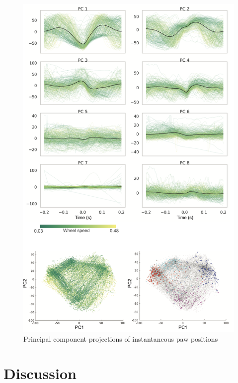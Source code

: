 \begin{figure}[h!]
    \centering
    \includegraphics[width=1\linewidth]{Chapters//Figures//chapter2/behavioral_PCA.png}
    \caption{Principal component projections of instantaneous paw positions}
    \label{fig:behav-pca}
\end{figure}

\section{Discussion}



